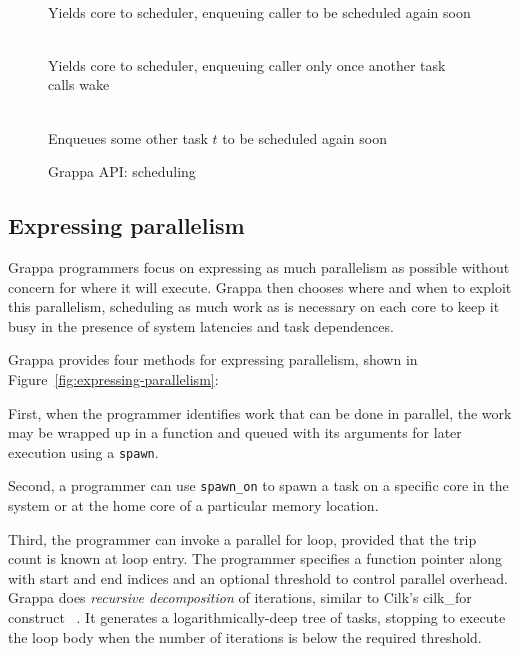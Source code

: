 \begin{figure}[htbp]
  \begin{center}
    \begin{description}\small
    \item[ \texttt{ yield() } ] \hfill \\
      Yields core to scheduler, enqueuing caller to be scheduled again soon
    \item[ \texttt{ suspend() } ] \hfill \\
      Yields core to scheduler, enqueuing caller only once another task calls wake
    \item[ \texttt{ wake( task * $t$ ) } ] \hfill \\
      Enqueues some other task $t$ to be scheduled again soon
    \end{description}
    \begin{minipage}{0.95\columnwidth}
      \caption{\label{fig:scheduling} Grappa API: scheduling} %
    \end{minipage}
  \end{center}
\end{figure}


\subsection{Expressing parallelism}

Grappa programmers focus on expressing as much
parallelism as possible without concern for where it will execute.
Grappa then chooses where and when to exploit this parallelism,
scheduling as much work as is necessary on each core to keep it busy
in the presence of system latencies and task dependences.

Grappa provides four methods for expressing parallelism, shown in
Figure~\ref{fig:expressing-parallelism}:

First, when the programmer identifies work
that can be done in parallel, the work may be wrapped up in a function
and queued with its arguments for later execution using a
\texttt{spawn}.

Second, a programmer can use \texttt{spawn\_on} to spawn a task on a
specific core in the system or at the home core of a particular memory
location.

Third, the programmer can invoke a parallel for loop, provided that
the trip count is known at loop entry. The programmer
specifies a function pointer along with start and end indices and an
optional threshold to control parallel overhead. Grappa does {\em
recursive decomposition} of iterations, similar to Cilk's cilk\_for
construct~\cite {cilkforimplementation} .  It generates a
logarithmically-deep tree of tasks, stopping to execute the loop body
when the number of iterations is below the required threshold.

